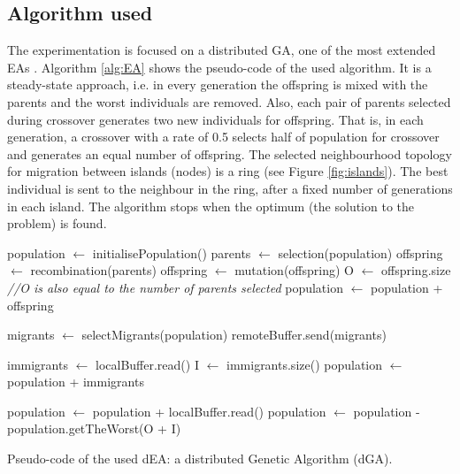 \documentclass[final,1p,times]{elsarticle}
\begin{document}



\subsection{Algorithm used}
The experimentation is focused on a distributed GA, one of the most extended EAs \cite{GeneticAlgorithmsEiben03}. Algorithm \ref{alg:EA} shows the pseudo-code of the  used algorithm.
It is a steady-state approach, i.e. in every generation the offspring is mixed with the parents and the worst individuals are removed. Also, each pair of parents selected during crossover generates two new individuals for offspring. That is, in each generation, a crossover with a rate of 0.5 selects half of population for crossover and generates an equal number of offspring. The selected neighbourhood topology for migration between islands (nodes) is a ring (see Figure \ref{fig:islands}). The best individual is sent to the neighbour in the ring, after a fixed number of generations in each island. The algorithm stops when the optimum (the solution to the problem) is found.  



\begin{algorithm}[htb]

\begin{algorithmic}
\STATE population $\gets$ initialisePopulation()
    \STATE parents $\gets$ selection(population)
    \STATE offspring $\gets$ recombination(parents)
    \STATE offspring $\gets$ mutation(offspring)
    \STATE O $\gets$ offspring.size {\em //O is also equal to the number of parents selected}
    \STATE population $\gets$ population + offspring
    
      \STATE migrants $\gets$ selectMigrants(population)
      \STATE remoteBuffer.send(migrants)
    \ENDIF

      \STATE immigrants $\gets$ localBuffer.read()
      \STATE I $\gets$ immigrants.size()
      \STATE population $\gets$ population + immigrants
    \ENDIF
    
      \STATE population $\gets$ population + localBuffer.read()
    \ENDIF
    \STATE population $\gets$ population - population.getTheWorst(O + I)
\ENDWHILE

\end{algorithmic}

\caption{Pseudo-code of the used dEA: a distributed Genetic Algorithm (dGA).}
\label{alg:EA}
\end{algorithm}
\end{document}
